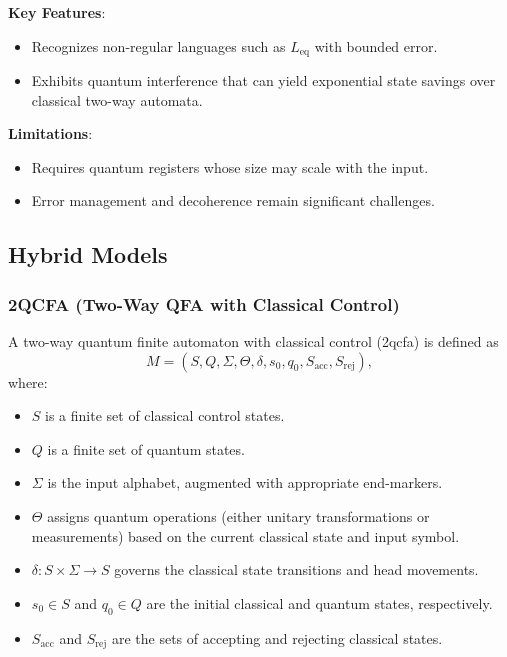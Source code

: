\textbf{Key Features}:
\begin{itemize}
    \item Recognizes non-regular languages such as \( L_{\text{eq}} \) with bounded error.
    \item Exhibits quantum interference that can yield exponential state savings over classical two-way automata.
\end{itemize}

\textbf{Limitations}:
\begin{itemize}
    \item Requires quantum registers whose size may scale with the input.
    \item Error management and decoherence remain significant challenges.
\end{itemize}

\subsection{Hybrid Models}
\label{subsec:two-way-hybrid}

\subsubsection{2QCFA (Two-Way QFA with Classical Control)}
\label{sssec:2qcfa}
\begin{definition}[2QCFA]
A two-way quantum finite automaton with classical control (\gls{2qcfa}) is defined as 
\[
M = (S, Q, \Sigma, \Theta, \delta, s_0, q_0, S_{\text{acc}}, S_{\text{rej}}),
\]
where:
\begin{itemize}
    \item \( S \) is a finite set of classical control states.
    \item \( Q \) is a finite set of quantum states.
    \item \( \Sigma \) is the input alphabet, augmented with appropriate end-markers.
    \item \( \Theta \) assigns quantum operations (either unitary transformations or measurements) based on the current classical state and input symbol.
    \item \( \delta: S \times \Sigma \to S \) governs the classical state transitions and head movements.
    \item \( s_0 \in S \) and \( q_0 \in Q \) are the initial classical and quantum states, respectively.
    \item \( S_{\text{acc}} \) and \( S_{\text{rej}} \) are the sets of accepting and rejecting classical states.
\end{itemize}
\end{definition}

